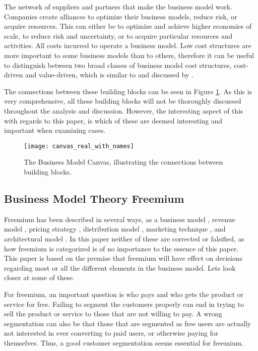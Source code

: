 \begin{items}
   The network of suppliers and partners that make the business model work. Companies create alliances to optimize their business models, reduce risk, or acquire resources. This can either be to optimize and achieve higher economies of scale, to reduce risk and uncertainty, or to acquire particular resources and activities.
   All costs incurred to operate a business model. Low cost structures are more important to some business models than to others, therefore it can be useful to distinguish between two broad classes of business model cost structures, cost-driven and value-driven, which is similar to  and  discussed by \citet{porter1980}.
\end{items}

The connections between these building blocks can be seen in Figure \ref{figure:businessmodel:canvas}. As this is very comprehensive, all these building blocks will not be thoroughly discussed throughout the analysis and discussion. However, the interesting aspect of this with regards to this paper, is which of these are deemed interesting and important when examining cases.

\begin{figure}[h]
  \label{figure:businessmodel:canvas}
  \texttt{[image: canvas\_real\_with\_names]}
  \caption{The Business Model Canvas, illustrating the connections between building blocks.}
\end{figure}

\subsection{Business Model Theory \oldand Freemium}
\label{section:businessmodels:freemium}

Freemium has been described in several ways, \eg as a business model \citep{wilson2006}, revenue model \citep{parker2008}, pricing strategy \citep{lunn2010}, distribution model \citep{dahlquist2010}, marketing technique \citep{semeria2009}, and architectural model \citep{bhullar2010}. In this paper neither of these are corrected or falsified, as how freemium is categorized is of no importance to the essence of this paper. This paper is based on the premise that freemium will have effect on decisions regarding most or all the different elements in the business model. Lets look closer at some of these.

For freemium, an important question is who pays and who gets the product or service for free. Failing to segment the customers properly can end in trying to sell the product or service to those that are not willing to pay. A wrong segmentation can also be that those that are segmented as free users are actually not interested in ever converting to paid users, or otherwise paying for themselves. Thus, a good customer segmentation seems essential for freemium.

